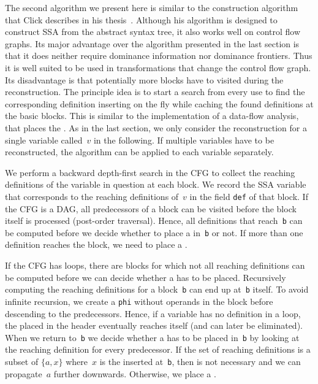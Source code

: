 The second algorithm we present here is similar to the construction algorithm that Click describes in his thesis~\cite{click:thesis}.
Although his algorithm is designed to construct SSA from the abstract syntax tree, it also works well on control flow graphs.
Its major advantage over the algorithm presented in the last section is that it does neither require dominance information nor dominance frontiers.
Thus it is well suited to be used in transformations that change the control flow graph.
Its disadvantage is that potentially more blocks have to visited during the reconstruction.
The principle idea is to start a search from every use to find the corresponding definition inserting \phifuns on the fly while caching the found definitions at the basic blocks.
This is similar to the implementation of a data-flow analysis, that places the \phifuns.
As in the last section, we only consider the reconstruction for a single variable called~$v$ in the following.
If multiple variables have to be reconstructed, the algorithm can be applied to each variable separately.

We perform a backward depth-first search in the CFG to collect the reaching definitions of the variable in question at each block.
We record the SSA variable that corresponds to the reaching definitions of~$v$ in the field \verb|def| of that block.
If the CFG is a DAG, all predecessors of a block can be visited before the block itself is processed (post-order traversal).
Hence, all definitions that reach~\verb|b| can be computed before we decide whether to place a \phifun in~\verb|b| or not.
If more than one definition reaches the block, we need to place a \phifun.

If the CFG has loops, there are blocks for which not all reaching definitions can be computed before we can decide whether a \phifun has to be placed.
Recursively computing the reaching definitions for a block~\verb|b| can end up at~\verb|b| itself.
To avoid infinite recursion, we create a \phifun \verb|phi| without operands in the block before descending to the predecessors. 
Hence, if a variable has no definition in a loop, the \phifun placed in the header eventually reaches itself (and can later be eliminated). 
When we return to~\verb|b| we decide whether a \phifun has to be placed in~\verb|b| by looking at the reaching definition for every predecessor.
If the set of reaching definitions is a subset of $\{a,x\}$ where~$x$ is the \phifun inserted at~\verb|b|, then \phifun is not necessary and we can propagate~$a$ further downwards. 
Otherwise, we place a \phifun.

